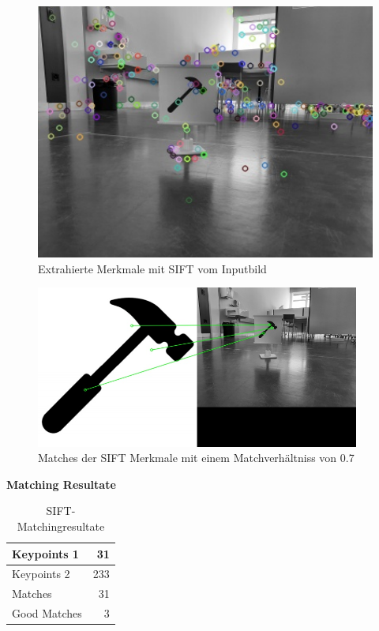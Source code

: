 \begin{figure}[H]
\begin{minipage}[t]{0.45\linewidth}
  \includegraphics[width=1.0\textwidth]{img/piktogrammerkennung/sift_kp2.jpg}
  \caption{Extrahierte Merkmale mit SIFT vom Inputbild}
  \label{fig:sift-kp2}
  \end{minipage}
\end{figure}

\begin{figure}[H]
  \includegraphics[width=0.95\textwidth]{img/piktogrammerkennung/sift_matches.jpg}
  \centering
  \caption{Matches der SIFT Merkmale mit einem Matchverhältniss von 0.7}
  \label{fig:sift-matches-0.7}
\end{figure}

\textbf{Matching Resultate}
\begin{center}
\begin{table}[H]
\begin{tabular}{|l|r|}
\hline
Keypoints 1 & 31 \\
\hline
Keypoints 2 & 233 \\
\hline
Matches & 31 \\
\hline
Good Matches & 3 \\
\hline
\end{tabular}
\caption[SIFT-Matchingresultate]{SIFT-Matchingresultate}
\label{tab:sift-matchingresultate}
\end{table}
\end{center}

